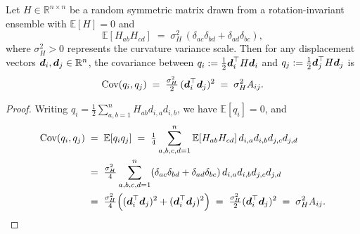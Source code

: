 \begin{proposition}
\label{prop:kernel-stat}
Let $H \in \mathbb{R}^{n\times n}$ be a random symmetric matrix drawn from a rotation-invariant ensemble with $\mathbb{E}[H] = 0$ and
\begin{equation*}
  \mathbb{E}[H_{ab} H_{cd}] \;=\; \sigma_H^2\,(\delta_{ac}\delta_{bd} + \delta_{ad}\delta_{bc}),
\end{equation*}
where $\sigma_H^2 > 0$ represents the curvature variance scale. Then for any displacement vectors $\boldsymbol{d}_i, \boldsymbol{d}_j \in \mathbb{R}^n$, the covariance between $q_i := \tfrac{1}{2} \boldsymbol{d}_i^\top H \boldsymbol{d}_i$ and $q_j := \tfrac{1}{2} \boldsymbol{d}_j^\top H \boldsymbol{d}_j$ is
\begin{equation*}
  \operatorname{Cov}(q_i, q_j) \;=\; \tfrac{\sigma_H^2}{2}\,(\boldsymbol{d}_i^\top \boldsymbol{d}_j)^2 \;=\; \sigma_H^2 A_{ij}.
\end{equation*}
\end{proposition}

\begin{proof}
Writing $q_i = \tfrac{1}{2}\sum_{a,b=1}^n H_{ab} d_{i,a} d_{i,b}$, we have $\mathbb{E}[q_i] = 0$, and
\begin{align*}
  \operatorname{Cov}(q_i, q_j)
  &\;=\; \mathbb{E}[q_i q_j]
  \;=\; \tfrac{1}{4} \sum_{a,b,c,d=1}^n \mathbb{E}[H_{ab} H_{cd}]\,d_{i,a} d_{i,b} d_{j,c} d_{j,d} \\
  &\;=\; \tfrac{\sigma_H^2}{4} \sum_{a,b,c,d=1}^n (\delta_{ac}\delta_{bd} + \delta_{ad}\delta_{bc})\,d_{i,a} d_{i,b} d_{j,c} d_{j,d} \\
  &\;=\; \tfrac{\sigma_H^2}{4} \Bigl((\boldsymbol{d}_i^\top \boldsymbol{d}_j)^2 + (\boldsymbol{d}_i^\top \boldsymbol{d}_j)^2\Bigr)
  \;=\; \tfrac{\sigma_H^2}{2} (\boldsymbol{d}_i^\top \boldsymbol{d}_j)^2
  \;=\; \sigma_H^2 A_{ij}.
\end{align*}
\end{proof}

